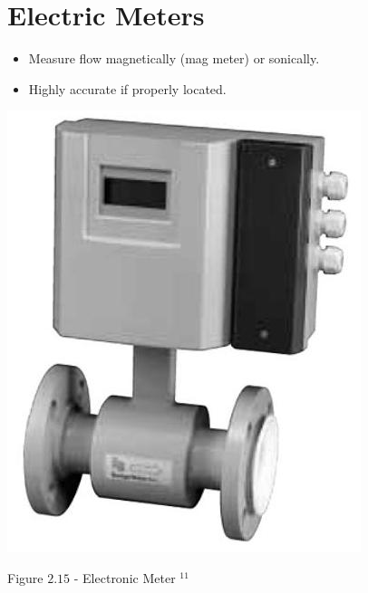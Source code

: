 \documentclass[10pt]{article}
\begin{document}
\section{Electric Meters}
\begin{itemize}
  \item Measure flow magnetically (mag meter) or sonically.

  \item Highly accurate if properly located.

\end{itemize}
\includegraphics[max width=\textwidth]{ElectronicMeter}

Figure $2.15$ - Electronic Meter ${ }^{11}$
\end{document}
